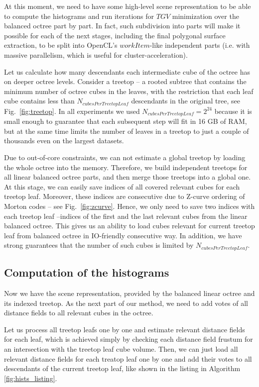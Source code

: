 \documentclass[10pt,twocolumn,letterpaper]{article}
\begin{document}
At this moment, we need to have some high-level scene representation to be able to compute the histograms and
run iterations for $TGV$ minimization over the balanced octree part by part. In fact, such
subdivision into parts will make it possible for each of the next stages, including the final polygonal surface extraction,
to be split into OpenCL's $workItem$-like independent parts (i.e. with massive parallelism, which is useful for cluster-acceleration).

Let us calculate how many descendants each intermediate cube of the octree has on deeper octree levels.
Consider a treetop -- a rooted subtree that contains the minimum number of octree cubes in the leaves, with the restriction that each
leaf cube contains less than $N_{cubesPerTreetopLeaf}$ descendants in the original tree, see Fig.~\ref{fig:treetop}.
In all experiments we used $N_{cubesPerTreetopLeaf} = 2^{24}$
because it is small enough to guarantee that each subsequent step will fit in 16 GB of RAM, but at the same time limits
the number of leaves in a treetop to just a couple of thousands even on the largest datasets.

Due to out-of-core constraints, we can not estimate a global treetop by loading the whole octree into the memory.
Therefore, we build independent treetops for all linear balanced octree parts, and then merge those treetops
into a global one. At this stage, we can easily save indices of all covered relevant cubes for each treetop leaf.
Moreover, these indices are consecutive due to Z-curve ordering of Morton codes -- see Fig.~\ref{fig:zcurve}.
Hence, we only need to save two indices with each treetop leaf --indices of the first and the last relevant cubes from the linear balanced octree.
This gives us an ability to load cubes relevant for current treetop leaf from balanced octree in IO-friendly consecutive way.
In addition, we have strong guarantees that the number of such cubes is limited by $N_{cubesPerTreetopLeaf}$.

\subsection{Computation of the histograms}
\label{sec:hists-init}

Now we have the scene representation, provided by the balanced linear octree and its indexed treetop. As the next part of our method,
we need to add votes of all distance fields to all relevant cubes in the octree.

Let us process all treetop leafs one by one and estimate relevant distance fields for each leaf, which is achieved simply by
checking each distance field frustum for an intersection with the treetop leaf cube volume. Then, we can just load all relevant distance fields
for each treatop leaf one by one and add their votes to all descendants
of the current treetop leaf, like shown in the listing in Algorithm \ref{fig:hists_listing}.
\end{document}
